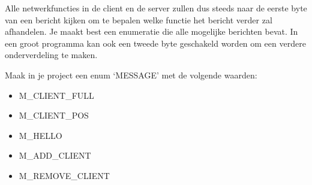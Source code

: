 Alle netwerkfuncties in de client en de server zullen dus steeds naar de eerste byte van een bericht kijken om te bepalen welke functie het bericht verder zal afhandelen. Je maakt best een enumeratie die alle mogelijke berichten bevat. In een groot programma kan ook een tweede byte geschakeld worden om een verdere onderverdeling te maken.

\begin{exercise} 
Maak in je project een enum `MESSAGE' met de volgende waarden: 
\begin{itemize}
	\item M\_CLIENT\_FULL
	\item M\_CLIENT\_POS
	\item M\_HELLO
	\item M\_ADD\_CLIENT
	\item M\_REMOVE\_CLIENT
\end{itemize}
\end{exercise}


